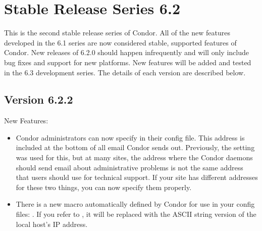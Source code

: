 \section{\label{sec:History-6-2}Stable Release Series 6.2}

This is the second stable release series of Condor.
All of the new features developed in the 6.1 series are now considered
stable, supported features of Condor.
New releases of 6.2.0 should happen infrequently and will only include
bug fixes and support for new platforms.
New features will be added and tested in the 6.3 development series. 
The details of each version are described below.


\subsection{\label{sec:New-6-2-2}Version 6.2.2}
\noindent New Features:
\begin{itemize}

\item Condor administrators can now specify
 in their config file.
This address is included at the bottom of all email Condor sends out.
Previously, the  setting was used for this, but
at many sites, the address where the Condor daemons should send email
about administrative problems is not the same address that users
should use for technical support.
If your site has different addresses for these two things, you can now
specify them properly.

\item There is a new macro automatically defined by Condor for use in
your config files: .
If you refer to , it will be replaced with the
ASCII string version of the local host's IP address.

\end{itemize}

